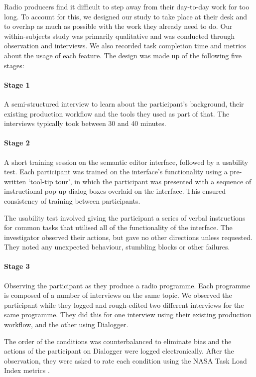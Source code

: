 Radio producers find it difficult to step away from their day-to-day work for too long. To account for this, we
designed our study to take place at their desk and to overlap as much as possible with the work they already need to
do.  Our within-subjects study was primarily qualitative and was conducted through observation and interviews. We also
recorded task completion time and metrics about the usage of each feature. The design was made up of the following five
stages:

\paragraph{Stage 1}
    A semi-structured interview to learn about the participant's background, their existing production workflow and the
    tools they used as part of that. The interviews typically took between 30 and 40 minutes.

\paragraph{Stage 2}
    A short training session on the semantic editor interface, followed by a usability test.  Each participant was
    trained on the interface's functionality using a pre-written `tool-tip tour', in which the participant was
    presented with a sequence of instructional pop-up dialog boxes overlaid on the interface.  This ensured consistency
    of training between participants.

    The usability test involved giving the participant a series of verbal instructions for common tasks that utilised
    all of the functionality of the interface. The investigator observed their actions, but gave no other directions
    unless requested. They noted any unexpected behaviour, stumbling blocks or other failures.

\paragraph{Stage 3}
    Observing the participant as they produce a radio programme.  Each programme is composed of a number of interviews
    on the same topic.  We observed the participant while they logged and rough-edited two different interviews for the
    same programme. They did this for one interview using their existing production workflow, and the other using
    Dialogger.
    
    The order of the conditions was counterbalanced to eliminate bias and the actions of the participant on Dialogger
    were logged electronically. After the observation, they were asked to rate each condition using the NASA Task Load
    Index metrics \citep{Hart1988}.

